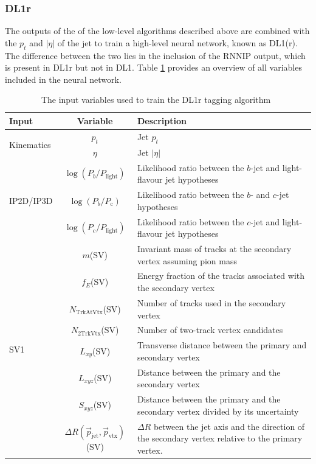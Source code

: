 \documentclass[10pt,a4paper]{book}
\begin{document}
\subsubsection{DL1r}

The outputs of the of the low-level algorithms described above are combined with the $p_t$ and $\vert\eta\vert$ of the jet to train a high-level neural network, known as DL1(r). The difference between the two lies in the inclusion of the RNNIP output, which is present in DL1r but not in DL1. 
Table \ref{tab:HLTaggerInputs} provides an overview of all variables included in the neural network.

\begin{table}[htbp]
\caption{The input variables used to train the DL1r tagging algorithm~\cite{ATLAS:2022qxm}}
\label{tab:HLTaggerInputs}
\begin{center}
\scriptsize
\begin{tabular}{|l|c|p{}|}
\hline
Input & Variable & Description \\
\hline
\multirow{2}{*}{Kinematics}
& $p_t$ & Jet $p_t$ \\
& $\eta$ & Jet $|\eta|$ \\
\hline
\multirow{3}{*}{IP2D/IP3D}
& $\log(P_{b}/P_{\mathrm{light}})$  & Likelihood ratio between the $b$-jet and light-flavour jet hypotheses  \\
& $\log(P_{b}/P_{\mathrm{c}})$  & Likelihood ratio between the $b$- and $c$-jet hypotheses  \\
& $\log(P_{c}/P_{\mathrm{light}})$  & Likelihood ratio between the $c$-jet and light-flavour jet hypotheses  \\
\hline
\multirow{8}{*}{SV1}
& $m$(SV) & Invariant mass of tracks at the secondary vertex assuming pion mass \\
& $f_E$(SV) & Energy fraction of the tracks associated with the secondary vertex \\
& $N_{{\mathrm{TrkAtVtx}}}$(SV) & Number of tracks used in the secondary vertex \\
& $N_{{\mathrm{2TrkVtx}}}$(SV) & Number of two-track vertex candidates \\
& $L_{xy}$(SV) & Transverse distance between the primary and secondary vertex \\
& $L_{xyz}$(SV)& Distance between the primary and the secondary vertex  \\
& $S_{xyz}$(SV)& Distance between the primary and the secondary vertex divided by its uncertainty \\
& $\Delta R(\vec p_{\mathrm{jet}}, \vec p_{\mathrm{vtx}})$(SV) & $\Delta R$ between the jet axis and the direction of the secondary vertex relative to the primary vertex. \\

\end{tabular}
\end{center}
\end{table}
\end{document}
